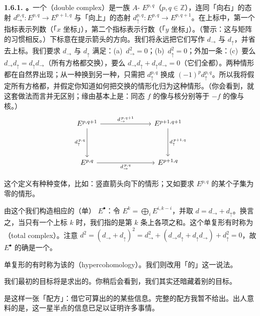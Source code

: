 \textbf{1.6.1. \trDoubleComplex。}\quad 一个\textbf{\trDoubleComplex}（double complex）是一族 $A$-\trModule{} $E^{p,q}$（$p,q\in\mathbb{Z}$），连同「向右」的态射 $d^{p,q}_{\to}\colon E^{p,q}\to E^{p+1,q}$ 与「向上」的态射 $d^{p,q}_{\uparrow}\colon E^{p,q}\to E^{p,q+1}$。在上标中，第一个指标表示列数（「$x$ 坐标」），第二个指标表示行数（「$y$ 坐标」）。（警示：这与矩阵的习惯相反。）下标意在提示箭头的方向。我们将永远把它们写作 $d_{\to}$ 与 $d_{\uparrow}$，并省去上标。我们要求 $d_{\to}$ 与 $d_{\uparrow}$ 满足：(a)~$d_{\to}^{2}=0$；(b)~$d_{\uparrow}^{2}=0$；外加一条：(c)~要么 $d_{\to}d_{\uparrow}=d_{\uparrow}d_{\to}$（所有方格都交换），要么 $d_{\to}d_{\uparrow}+d_{\uparrow}d_{\to}=0$（它们全都\trAnticommute）。两种情形都在自然界出现；从一种换到另一种，只需把 $d^{p,q}_{\uparrow}$ 换成 $(-1)^{p}d^{p,q}_{\uparrow}$。所以我将假定所有方格都\trAnticommute，并假定你知道如何把交换的情形化归为这种情形。（你会看到，就这套做法而言并无区别；缘由基本上是：同态 $f$ 的像与核分别等于 $-f$ 的像与核。）
\[
\begin{tikzcd}[row sep=2.0em, column sep=3.2em]
E^{p,q+1} \ar[rr,"d_{\to}^{\,p,q+1}"] \ar[dd,"d_{\uparrow}^{\,p,q}"'] & \text{\trAnticommute} & E^{p+1,q+1} \ar[dd,"d_{\uparrow}^{\,p+1,q}"] \\
 & & \\
E^{p,q} \ar[rr,"d_{\to}^{\,p,q}"'] & & E^{p+1,q}
\end{tikzcd}
\]

这个定义有种种变体，比如：竖直箭头向下的情形；又如要求 $E^{p,q}$ 的某个子集为零的情形。

由这个\trDoubleComplex{}我们构造相应的（单）\trComplexN{} $E^{\bullet}$：令 $E^{k}=\bigoplus_{i}E^{i,k-i}$，并取 $d=d_{\to}+d_{\uparrow}$。换言之，当只有一个上标 $k$ 时，我们指的是\trDoubleComplex{}第 $k$ 条\trAntidiagonal{}上各项之和。这个单复形有时称为\textbf{\trTotalComplex}（total complex）。注意 $d^{2}=(d_{\to}+d_{\uparrow})^{2}=d_{\to}^{2}+(d_{\to}d_{\uparrow}+d_{\uparrow}d_{\to})+d_{\uparrow}^{2}=0$，故 $E^{\bullet}$ 的确是一个\trComplexN。

单复形的\trCohomology{}有时称为该\trDoubleComplex{}的\textbf{\trHypercohomology}（hypercohomology）。我们则改用「\trDoubleComplex{}的\trCohomology」这一说法。

我们最初的目标将是求出\trDoubleComplex{}的\trCohomology。你稍后会看到，我们其实还暗藏着别的目标。

\trSpectralSequence{}是这样一张「配方」：借它可算出\trDoubleComplex{}的\trCohomology{}的某些信息。完整的配方我暂不给出。出人意料的是，这一星半点的信息已足以证明许多事情。

